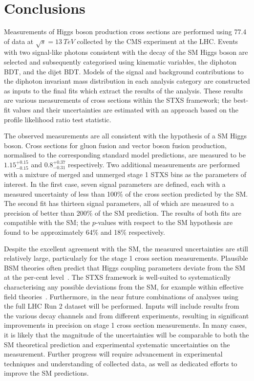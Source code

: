 \chapter{Conclusions}
\label{chap:conclusions}

Measurements of Higgs boson production cross sections are performed using \SI{77.4}{\fbinv} of 
data at $\sqrt{s} = \SI{13}{TeV}$ collected by the CMS experiment at the LHC.
Events with two signal-like photons consistent with the decay of the SM Higgs boson are selected
and subsequently categorised using kinematic variables, the diphoton BDT, and the dijet BDT.
Models of the signal and background contributions to the diphoton invariant mass distribution 
in each analysis category are constructed as inputs to the final fits
which extract the results of the analysis.
These results are various measurements of cross sections within the STXS framework;
the best-fit values and their uncertainties are estimated with an approach 
based on the profile likelihood ratio test statistic.

The observed measurements are all consistent with the hypothesis of a SM Higgs boson.
Cross sections for gluon fusion and vector boson fusion production, 
normalised to the corresponding standard model predictions,
are measured to be $1.15_{-0.15}^{+0.15}$ and $0.8_{-0.31}^{+0.37}$ respectively.
Two additional measurements are performed with a mixture of merged and unmerged 
stage 1 STXS bins as the parameters of interest.
In the first case, seven signal parameters are defined, 
each with a measured uncertainty of less than 100\% of the cross section predicted by the SM.
The second fit has thirteen signal parameters, all of which are measured to a precision 
of better than 200\% of the SM prediction.
The results of both fits are compatible with the SM; the $p$-values with respect to the SM hypothesis
are found to be approximately 64\% and 18\% respectively.

Despite the excellent agreement with the SM, 
the measured uncertainties are still relatively large, 
particularly for the stage 1 cross section measurements.
Plausible BSM theories often predict that Higgs coupling parameters 
deviate from the SM at the per-cent level~\cite{Snowmass}.
The STXS framework is well-suited to systematically characterising 
any possible deviations from the SM, for example within effective field theories~\cite{STXStoEFT}.
Furthermore, 
in the near future combinations of analyses using the full LHC Run 2 dataset will be performed.
Inputs will include results from the various decay channels and from different experiments, 
resulting in significant improvements in precision on stage 1 cross section measurements.
In many cases, it is likely that the magnitude of the uncertainties will be comparable to both 
the SM theoretical prediction and experimental systematic uncertainties on the measurement.
Further progress will require advancement in experimental techniques 
and understanding of collected data, as well as dedicated efforts to improve the SM predictions.

